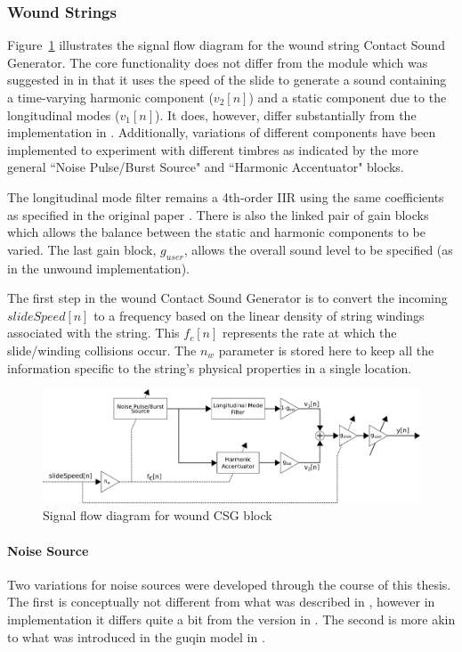 \documentclass[../main.tex]{subfiles}
\begin{document}
\subsubsection{Wound Strings}
Figure~\ref{fig:CSG_wound} illustrates the signal flow diagram for the wound string Contact Sound Generator. The core functionality does not differ from the module which was suggested in  in that it uses the speed of the slide to generate a sound containing a time-varying harmonic component ($v_2[n]$) and a static component due to the longitudinal modes ($v_1[n]$). It does, however,  differ substantially from the implementation in . Additionally, variations of different components have been implemented to experiment with different timbres as indicated by the more general ``Noise Pulse/Burst Source" and ``Harmonic Accentuator" blocks.

The longitudinal mode filter remains a 4th-order IIR using the same coefficients as specified in the original paper . There is also the linked pair of gain blocks which allows the balance between the static and harmonic components to be varied. The last gain block, $g_{user}$, allows the overall sound level to be specified (as in the unwound implementation).

The first step in the wound Contact Sound Generator is to convert the incoming $slideSpeed[n]$ to a frequency based on the linear density of string windings associated with the string. This $f_c[n]$ represents the rate at which the slide/winding collisions occur. The $n_w$ parameter is stored here to keep all the information specific to the string's physical properties in a single location.

\begin{figure}[h]
    \centering
    \includegraphics[scale=.5]{./images/diagrams/CSG_wound.png}
    \caption{Signal flow diagram for wound CSG block}
    \label{fig:CSG_wound}
\end{figure}

\paragraph{Noise Source}
Two variations for noise sources were developed through the course of this thesis. The first is conceptually not different from what was described in , however in implementation it differs quite a bit from the version in . The second is more akin to what was introduced in  the guqin model in .
\end{document}
